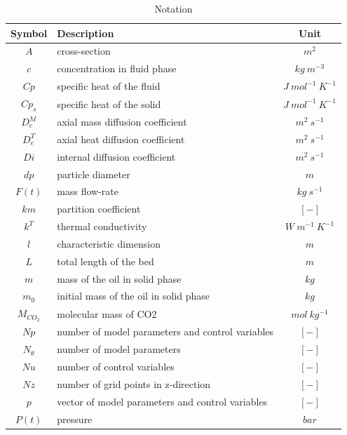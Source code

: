 \documentclass[a4paper,fleqn]{cas-dc}
\begin{document}
\newpage
\begin{table}[p]
		\caption{Notation}
		\label{tab::symbols}
		\begin{tabular}{ |c|l|c| } 
			\hline
			Symbol 		& 	Description 							& Unit 						\\ \hline
			$A$			&	cross-section							& $m^2$ 					\\ \hline
			$c$			&	concentration in fluid phase			& $kg ~ m^{-3}$				\\ \hline
			$Cp$		&	specific heat of the fluid				& $J ~ mol^{-1} ~ K^{-1}$ 	\\ \hline
			$Cp_s$		&	specific heat of the solid				& $J ~ mol^{-1} ~ K^{-1}$ 	\\ \hline
			$D_e^M$		&	axial mass diffusion coefficient		& $m^2 ~ s^{-1}$			\\ \hline
			$D_e^T$		&	axial heat diffusion coefficient		& $m^2 ~ s^{-1}$			\\ \hline
			$Di$		&	internal diffusion coefficient			& $m^2 ~ s^{-1}$			\\ \hline
			$dp$		&	particle diameter						& $m$						\\ \hline
			$F(t)$		&	mass flow-rate							& $kg ~ s^{-1}$				\\ \hline
			$km$		&	partition coefficient					& $[-]$						\\ \hline
			$k^T$		&	thermal conductivity					& $W ~ m^{-1} ~ K^{-1}$		\\ \hline
			$l$			&	characteristic dimension				& $m$						\\ \hline
			$L$			&	total length of the bed					& $m$						\\ \hline
			$m$			&	mass of the oil in solid phase			& $kg$						\\ \hline
			$m_0$		&	initial mass of the oil in solid phase	& $kg$						\\ \hline
			$M_{CO_2}$	&	molecular mass of CO2					& $mol ~ kg^{-1}$			\\ \hline
			$Np$		&	number of model parameters and control variables & $[-]$			\\ \hline
			$N_{\theta}$&	number of model parameters				& $[-]$						\\ \hline
			$Nu$		&	number of control variables				& $[-]$						\\ \hline
			$Nz$		&	number of grid points in z-direction	& $[-]$						\\ \hline
			$p$			&	vector of model parameters and control variables	& $[-]$			\\ \hline
			$P(t)$		&	pressure								& $bar$						\\ \hline

\end{tabular}
\end{table}
\end{document}
